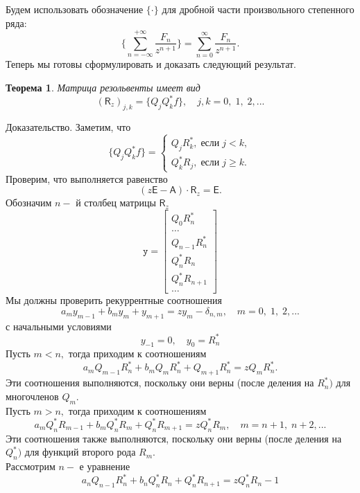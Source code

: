 \documentclass[12 pt, a4 paper]{article}
\theoremstyle{plain}   \newtheorem{Pro}{Задача}
\newtheorem{The}{Теорема}
\begin{document}
Будем использовать обозначение
$ \{ \cdot \} $
для дробной части произвольного степенного ряда:
$$
  \biggl \{ \sum _{n=-\infty}^{+\infty}
  \frac{ F_n }{z^{n+1}} \biggr \} =
  \sum _{n=0}^{\infty} \frac{F_n }{z^{n+1}}.
$$
Теперь мы готовы сформулировать и доказать следующий
результат.
\begin{The}
Матрица резольвенты имеет вид
$$
  (\mathsf{R}_z )_{j,k}=
  \{ Q_j Q_k ^{\ast} f \} ,
  \quad j,k=0, \; 1, \; 2,...
$$
\end{The}
{\Large Доказательство.}
Заметим, что
\begin{equation*}
  \{ Q_j Q_k ^{\ast} f \} =
    \begin{cases}
	  Q_j R_k ^{\ast}, \; если \; j<k,\\
	  Q_k ^{\ast} R_j , \; если \; j \geq k.
	\end{cases}
\end{equation*}
Проверим, что выполняется равенство
$$
  (z \mathsf{E} - \mathsf{A} ) \cdot \mathsf{R}_z = \mathsf{E}.
$$
Обозначим
$ n- $
й столбец матрицы
$ \mathsf{R}_z $
\begin{equation*}
  \mathtt{y}=
    \begin{bmatrix}
	  Q_0 R_n ^{\ast}\\
	  \dots \\
	  Q_{n-1} R_n ^{\ast} \\
	  Q_n ^{\ast} R_n \\
	  Q_n ^{\ast} R_{n+1} \\
	  \dots
	\end{bmatrix}
\end{equation*}
Мы должны проверить рекуррентные соотношения
$$
  a_m y_{m-1} + b_m y_m +y_{m+1} =
  z y_m - \delta _{n,m},
  \quad m=0, \; 1, \; 2,...
$$
с начальными условиями
$$
  y_{-1}=0, \quad y_0 = R_n ^{\ast}
$$
Пусть
$ m<n, $
тогда приходим к соотношениям
$$
  a_m Q_{m-1} R_n ^{\ast} +
  b_m Q_m R_n ^{\ast} +
  Q_{m+1} R_n ^{\ast} =
  z Q_m R_n ^{\ast}.
$$
Эти соотношения выполняются, поскольку они верны (после деления на
$ R_n ^{\ast}) $
для многочленов
$ Q_m . $
\\
Пусть
$ m>n, $
тогда приходим к соотношениям
$$
  a_m Q_n ^{\ast} R_{m-1}+
  b_m Q_n ^{\ast} R_m +
  Q_n ^{\ast} R_{m+1}=
  z Q_n ^{\ast} R_m ,
  \quad m=n+1, \; n+2,...
$$
Эти соотношения также выполняются, поскольку они верны
(после деления на
$ Q_n ^{\ast} )$
для функций второго рода
$ R_m . $
\\
Рассмотрим
$ n-$
е уравнение
$$
  a_n Q_{n-1} R_n ^{\ast} +
  b_n Q_n ^{\ast} R_n +
  Q_n ^{\ast} R_{n+1} =
  z Q_n ^{\ast} R_n -1
$$
\end{document}
